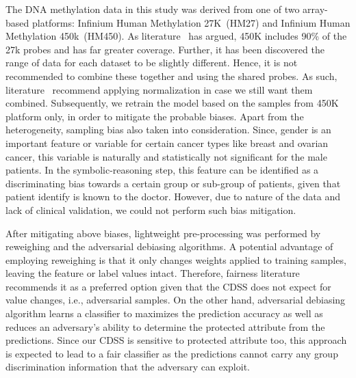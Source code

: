 \hspace*{3.5mm} The DNA methylation data in this study was derived from one of two array-based platforms: Infinium Human Methylation 27K~(HM27) and Infinium Human Methylation 450k~(HM450). As literature~\cite{pidsley2013data} has argued, 450K includes 90\% of the 27k probes and has far greater coverage. Further, it has been discovered the range of data for each dataset to be slightly different. Hence, it is not recommended to combine these together and using the shared probes. As such, literature~\cite{pidsley2013data} recommend applying normalization in case we still want them combined. Subsequently, we retrain the model based on the samples from 450K platform only, in order to mitigate the probable biases. 
Apart from the heterogeneity, sampling bias also taken into consideration. Since, gender is an important feature or variable for certain cancer types like breast and ovarian cancer, this variable is naturally and statistically not significant for the male patients. In the symbolic-reasoning step, this feature can be identified as a discriminating bias towards a certain group or sub-group of patients, given that patient identify is known to the doctor. However, due to nature of the data and lack of clinical validation, we could not perform such bias mitigation. 

\hspace*{3.5mm} After mitigating above biases, lightweight pre-processing was performed by reweighing and the adversarial debiasing algorithms. A potential advantage of employing reweighing is that it only changes weights applied to training samples, leaving the feature or label values intact. Therefore, fairness literature recommends it as a preferred option given that the CDSS does not expect for value changes, i.e., adversarial samples. On the other hand, adversarial debiasing algorithm learns a classifier to maximizes the prediction accuracy as well as reduces an adversary's ability to determine the protected attribute from the predictions. Since our CDSS is sensitive to protected attribute too, this approach is expected to lead to a fair classifier as the predictions cannot carry any group discrimination information that the adversary can exploit. 

